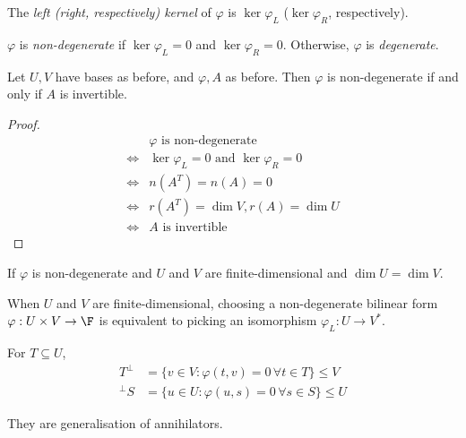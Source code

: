 \documentclass[a4paper]{article}
\theoremstyle{definition}
\begin{document}
\begin{definition}
  The \emph{left (right, respectively) kernel} of \(\varphi\) is \(\ker \varphi_L\) (\(\ker \varphi_R\), respectively).
\end{definition}

\begin{definition}[Degeneracy]
  \(\varphi\) is \emph{non-degenerate} if \(\ker \varphi_L = 0\) and \(\ker \varphi_R = 0\). Otherwise, \(\varphi\) is \emph{degenerate}.
\end{definition}

\begin{lemma}
  Let \(U, V\) have bases as before, and \(\varphi, A\) as before. Then \(\varphi\) is non-degenerate if and only if \(A\) is invertible.
\end{lemma}

\begin{proof}
  \begin{align*}
    & \varphi \text{ is non-degenerate} \\
    \Leftrightarrow & \ker \varphi_L = 0 \text{ and } \ker \varphi_R = 0 \\
    \Leftrightarrow & n(A^T) = n(A) = 0 \\
    \Leftrightarrow & r(A^T) = \dim V, r(A) = \dim U \\
    \Leftrightarrow & A \text{ is invertible}
  \end{align*}
\end{proof}

\begin{corollary}
  If \(\varphi\) is non-degenerate and \(U\) and \(V\) are finite-dimensional and \(\dim U = \dim V\).
\end{corollary}

\begin{corollary}
  When \(U\) and \(V\) are finite-dimensional, choosing a non-degenerate bilinear form \(\varphi: U \times V \to \F\) is equivalent to picking an isomorphism \(\varphi_L: U \to V^*\).
\end{corollary}

\begin{definition}
  For \(T \subseteq U\),
  \begin{align*}
    T^\perp &= \{ v\in V: \varphi(t, v) = 0 \, \forall t\in T \} \leq V \\
    ^\perp S &= \{ u\in U: \varphi(u, s) = 0 \, \forall s\in S \} \leq U
  \end{align*}
\end{definition}
They are generalisation of annihilators.
\end{document}
